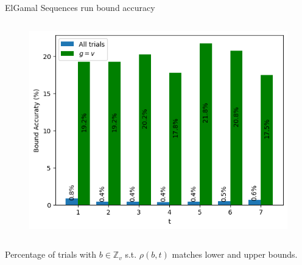 \begin{frame}{ElGamal Sequences run bound accuracy}
\begin{columns}
\begin{column}{0.45\textwidth}
\begin{figure}
                \includegraphics[width=\textwidth]{figures/RunsUpperBoundAccuracy.png}
            \end{figure}
        \end{column}
    \end{columns}
    \begin{center}
                Percentage of trials with $b\in\mathbb{Z}_v$ s.t. $\rho(b,t)$ matches lower and upper bounds.
    \end{center}
\end{frame}



